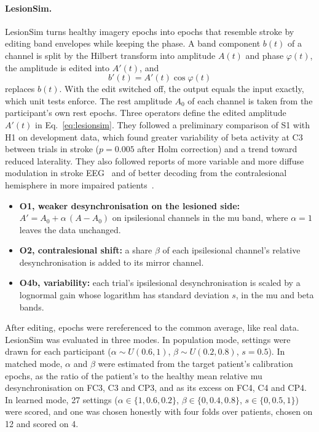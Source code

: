 \documentclass[pdflatex,sn-mathphys-num]{sn-jnl}
\begin{document}
\paragraph{LesionSim.} LesionSim turns healthy imagery epochs into epochs that resemble stroke by editing band envelopes while keeping the phase. A band component $b(t)$ of a channel is split by the Hilbert transform into amplitude $A(t)$ and phase $\varphi(t)$, the amplitude is edited into $A'(t)$, and
\begin{equation}
b'(t) = A'(t)\cos\varphi(t)\label{eq:lesionsim}
\end{equation}
replaces $b(t)$. With the edit switched off, the output equals the input exactly, which unit tests enforce. The rest amplitude $A_0$ of each channel is taken from the participant's own rest epochs. Three operators define the edited amplitude $A'(t)$ in Eq.~\eqref{eq:lesionsim}. They followed a preliminary comparison of S1 with H1 on development data, which found greater variability of beta activity at C3 between trials in stroke ($p = 0.005$ after Holm correction) and a trend toward reduced laterality. They also followed reports of more variable and more diffuse modulation in stroke EEG~\cite{via2026} and of better decoding from the contralesional hemisphere in more impaired patients~\cite{mansour2022}.
\begin{itemize}
\item \textbf{O1, weaker desynchronisation on the lesioned side:} $A' = A_0 + \alpha\,(A - A_0)$ on ipsilesional channels in the mu band, where $\alpha = 1$ leaves the data unchanged.
\item \textbf{O2, contralesional shift:} a share $\beta$ of each ipsilesional channel's relative desynchronisation is added to its mirror channel.
\item \textbf{O4b, variability:} each trial's ipsilesional desynchronisation is scaled by a lognormal gain whose logarithm has standard deviation $s$, in the mu and beta bands.
\end{itemize}
After editing, epochs were rereferenced to the common average, like real data. LesionSim was evaluated in three modes. In population mode, settings were drawn for each participant ($\alpha \sim U(0.6, 1)$, $\beta \sim U(0.2, 0.8)$, $s = 0.5$). In matched mode, $\alpha$ and $\beta$ were estimated from the target patient's calibration epochs, as the ratio of the patient's to the healthy mean relative mu desynchronisation on FC3, C3 and CP3, and as its excess on FC4, C4 and CP4. In learned mode, 27 settings ($\alpha \in \{1, 0.6, 0.2\}$, $\beta \in \{0, 0.4, 0.8\}$, $s \in \{0, 0.5, 1\}$) were scored, and one was chosen honestly with four folds over patients, chosen on 12 and scored on 4.
\end{document}
